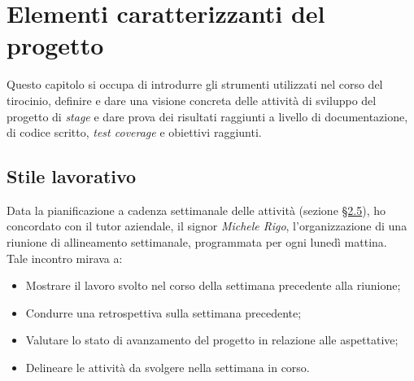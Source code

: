\chapter{Elementi caratterizzanti del progetto}
\label{cap:elementi-progetto}
Questo capitolo si occupa di introdurre gli strumenti utilizzati nel corso del tirocinio, definire e dare una visione concreta delle attività di sviluppo del progetto di \textit{stage} e dare prova dei risultati raggiunti
a livello di documentazione, di codice scritto, \textit{test coverage} e obiettivi raggiunti.

\section{Stile lavorativo}

Data la pianificazione a cadenza settimanale delle attività (sezione \hyperref[sec:pianificazione]{§2.5}), ho concordato con il tutor aziendale, il signor \textit{Michele Rigo}, l'organizzazione di una riunione di allineamento settimanale, programmata per ogni lunedì mattina. \\
Tale incontro mirava a:
\begin{itemize}
    \item Mostrare il lavoro svolto nel corso della settimana precedente alla riunione;
    \item Condurre una retrospettiva sulla settimana precedente;
    \item Valutare lo stato di avanzamento del progetto in relazione alle aspettative;
    \item Delineare le attività da svolgere nella settimana in corso.
\end{itemize}

